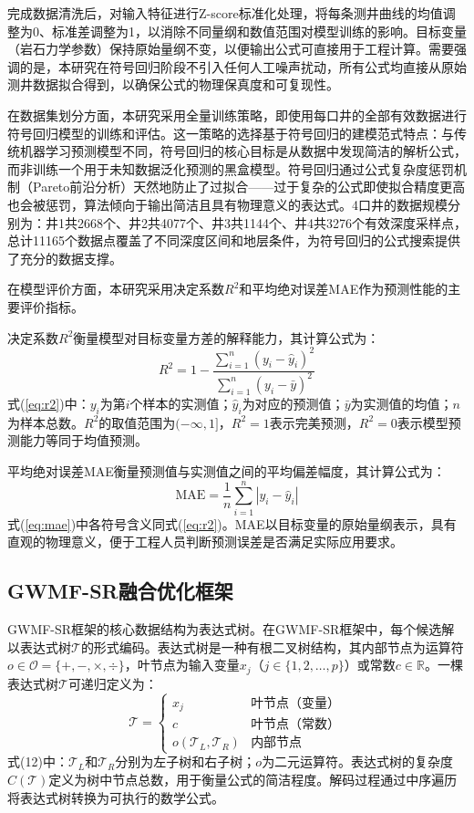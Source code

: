 \documentclass[a4paper,12pt]{ctexart}
\begin{document}
完成数据清洗后，对输入特征进行Z-score标准化处理，将每条测井曲线的均值调整为0、标准差调整为1，以消除不同量纲和数值范围对模型训练的影响。目标变量（岩石力学参数）保持原始量纲不变，以便输出公式可直接用于工程计算。需要强调的是，本研究在符号回归阶段不引入任何人工噪声扰动，所有公式均直接从原始测井数据拟合得到，以确保公式的物理保真度和可复现性。

在数据集划分方面，本研究采用全量训练策略，即使用每口井的全部有效数据进行符号回归模型的训练和评估。这一策略的选择基于符号回归的建模范式特点：与传统机器学习预测模型不同，符号回归的核心目标是从数据中发现简洁的解析公式，而非训练一个用于未知数据泛化预测的黑盒模型。符号回归通过公式复杂度惩罚机制（Pareto前沿分析）天然地防止了过拟合——过于复杂的公式即使拟合精度更高也会被惩罚，算法倾向于输出简洁且具有物理意义的表达式。4口井的数据规模分别为：井1共2668个、井2共4077个、井3共1144个、井4共3276个有效深度采样点，总计11165个数据点覆盖了不同深度区间和地层条件，为符号回归的公式搜索提供了充分的数据支撑。

在模型评价方面，本研究采用决定系数$R^2$和平均绝对误差MAE作为预测性能的主要评价指标。

决定系数$R^2$衡量模型对目标变量方差的解释能力，其计算公式为：
\begin{equation}
  R^2 = 1 - \frac{\sum_{i=1}^{n}(y_i - \hat{y}_i)^2}{\sum_{i=1}^{n}(y_i - \bar{y})^2} \tag{10}
  \label{eq:r2}
\end{equation}
式(\ref{eq:r2})中：$y_i$为第$i$个样本的实测值；$\hat{y}_i$为对应的预测值；$\bar{y}$为实测值的均值；$n$为样本总数。$R^2$的取值范围为$(-\infty, 1]$，$R^2=1$表示完美预测，$R^2=0$表示模型预测能力等同于均值预测。

平均绝对误差MAE衡量预测值与实测值之间的平均偏差幅度，其计算公式为：
\begin{equation}
  \text{MAE} = \frac{1}{n}\sum_{i=1}^{n}|y_i - \hat{y}_i| \tag{11}
  \label{eq:mae}
\end{equation}
式(\ref{eq:mae})中各符号含义同式(\ref{eq:r2})。MAE以目标变量的原始量纲表示，具有直观的物理意义，便于工程人员判断预测误差是否满足实际应用要求。

\subsection{GWMF-SR融合优化框架}

GWMF-SR框架的核心数据结构为表达式树。在GWMF-SR框架中，每个候选解以表达式树$\mathcal{T}$的形式编码。表达式树是一种有根二叉树结构，其内部节点为运算符$o \in \mathcal{O} = \{+, -, \times, \div\}$，叶节点为输入变量$x_j$（$j \in \{1, 2, \ldots, p\}$）或常数$c \in \mathbb{R}$。一棵表达式树$\mathcal{T}$可递归定义为：
\begin{equation}
\mathcal{T} = \begin{cases} x_j & \text{叶节点（变量）} \\ c & \text{叶节点（常数）} \\ o(\mathcal{T}_L, \mathcal{T}_R) & \text{内部节点} \end{cases} \tag{12}
\end{equation}
式(12)中：$\mathcal{T}_L$和$\mathcal{T}_R$分别为左子树和右子树；$o$为二元运算符。表达式树的复杂度$C(\mathcal{T})$定义为树中节点总数，用于衡量公式的简洁程度。解码过程通过中序遍历将表达式树转换为可执行的数学公式。
\end{document}
